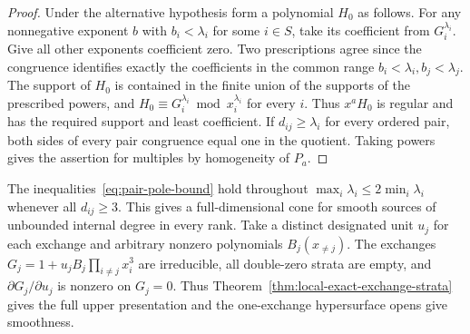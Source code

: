 \documentclass[11pt,reqno]{amsart}
\numberwithin{equation}{section}
\theoremstyle{definition}
\theoremstyle{remark}
\begin{document}
\begin{proof}
Under the alternative hypothesis form a polynomial \(H_0\) as follows.
For any nonnegative exponent \(b\) with \(b_i<\lambda_i\) for some
\(i\in S\), take its coefficient from \(G_i^{\lambda_i}\). Give all
other exponents coefficient zero. Two prescriptions agree since the
congruence identifies exactly the coefficients in the common range
\(b_i<\lambda_i, b_j<\lambda_j\). The support of \(H_0\) is contained
in the finite union of the supports of the prescribed powers, and
\(H_0\equiv G_i^{\lambda_i}\bmod x_i^{\lambda_i}\) for every \(i\).
Thus \(x^aH_0\) is regular and has the required support and least
coefficient. If \(d_{ij}\ge\lambda_i\) for every ordered pair,
both sides of every pair congruence equal one in the quotient.
Taking powers gives the assertion for multiples by homogeneity of \(P_a\).
\end{proof}

The inequalities~\eqref{eq:pair-pole-bound} hold throughout \(\max_i\lambda_i\le
2\min_i\lambda_i\) whenever all \(d_{ij}\ge3\). This gives a
full-dimensional cone for smooth sources of unbounded internal degree
in every rank. Take a distinct designated unit \(u_j\) for each
exchange and arbitrary nonzero
polynomials \(B_j(x_{\ne j})\). The exchanges
\(G_j=1+u_j B_j\prod_{i\ne j}x_i^3\) are irreducible, all double-zero
strata are empty, and \(\partial G_j/\partial u_j\) is nonzero on
\(G_j=0\). Thus Theorem~\ref{thm:local-exact-exchange-strata} gives the
full upper presentation and the one-exchange hypersurface opens give
smoothness.
\end{document}

